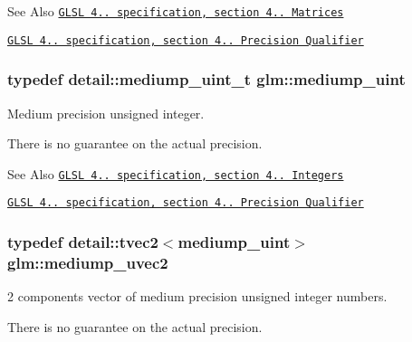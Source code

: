 \begin{DoxySeeAlso}{See Also}
\href{http://www.opengl.org/registry/doc/GLSLangSpec.4.20.8.pdf}{\tt G\-L\-S\-L 4.. specification, section 4.. Matrices} 

\href{http://www.opengl.org/registry/doc/GLSLangSpec.4.20.8.pdf}{\tt G\-L\-S\-L 4.. specification, section 4.. Precision Qualifier} 
\end{DoxySeeAlso}
\hypertarget{group__core__precision_ga08ae38ad78ade3539fdd1d25052b8c51}{
\subsubsection[{mediump\-\_\-uint}]{\setlength{\rightskip}{0pt plus 5cm}typedef detail\-::mediump\-\_\-uint\-\_\-t {\bf glm\-::mediump\-\_\-uint}}}\label{group__core__precision_ga08ae38ad78ade3539fdd1d25052b8c51}


Medium precision unsigned integer. 

There is no guarantee on the actual precision.

\begin{DoxySeeAlso}{See Also}
\href{http://www.opengl.org/registry/doc/GLSLangSpec.4.20.8.pdf}{\tt G\-L\-S\-L 4.. specification, section 4.. Integers} 

\href{http://www.opengl.org/registry/doc/GLSLangSpec.4.20.8.pdf}{\tt G\-L\-S\-L 4.. specification, section 4.. Precision Qualifier} 
\end{DoxySeeAlso}
\hypertarget{group__core__precision_ga95f22fddbbb9561e648aaa2a461be59c}{
\subsubsection[{mediump\-\_\-uvec2}]{\setlength{\rightskip}{0pt plus 5cm}typedef detail\-::tvec2$<$mediump\-\_\-uint$>$ {\bf glm\-::mediump\-\_\-uvec2}}}\label{group__core__precision_ga95f22fddbbb9561e648aaa2a461be59c}


2 components vector of medium precision unsigned integer numbers. 

There is no guarantee on the actual precision.

